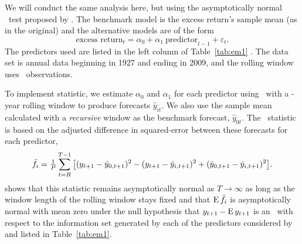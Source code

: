 \documentclass[12pt,fleqn]{article}
\begin{document}
We will conduct the same analysis here, but using the asymptotically
normal \mds\ test proposed by \cite{Cal:16}.  The benchmark model is
the excess return's sample mean (as in the original) and the
alternative models are of the form
\begin{equation}\label{eq:29}
  \text{excess return}_{t} = \alpha_{0} +
  \alpha_{1}\ \text{predictor}_{t-1} + \varepsilon_{t}.
\end{equation}
The predictors used are listed in the left
column of Table~\ref{tab:em1} \citep[see][for a detailed description
of the variables]{GoW:08}. The data set is annual data beginning in
1927 and ending in 2009, and the rolling window uses \windowlength\
observations.

To implement  statistic, we estimate $\alpha_0$ and
$\alpha_1$ for each predictor using \ols\ with a \windowlength-year
rolling window to produce forecasts $\hat y_{it}$. We also use the
sample mean calculated with a \emph{recursive} window as the benchmark
forecast, $\hat y_{0t}$. The \oos\ statistic is based on the adjusted
difference in squared-error between these forecasts for each
predictor,
\begin{equation*}
  \bar f_i = \tfrac{1}{P} \sum_{t=R}^{T-1}
  \big[(y_{t+1} - \hat y_{0,t+1})^2 - (y_{t+1} - \hat y_{i,t+1})^2 +
  (\hat y_{0,t+1} - \hat y_{i,t+1})^2 \big].
\end{equation*}
\citet{Cal:16} shows that this statistic remains asymptotically normal
as $T \to \infty$ as long as the window length of the rolling window
stays fixed and that $\operatorname{E} \bar f_i$ is asymptotically normal with mean zero
under the null hypothesis that $y_{t+1} - \operatorname{E} y_{t+1}$ is an \mds\ with
respect to the information set generated by each of the predictors
considered by \citet{GoW:08} and listed in Table~\ref{tab:em1}.
\end{document}
